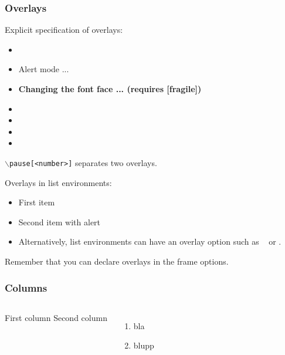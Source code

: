 \begin{frame}[fragile]
  \frametitle{Overlays}
  {\small 

    Explicit specification of overlays:
    \begin{itemize}
    \item {}
    \item \alert<3>{Alert mode ...} 
    \item \textbf<4>{Changing the font face ... (requires [fragile])}
    \item {} 
    \item {}
    \item {}
    \item {}
    \end{itemize}

    \vfill
    {\tt $\backslash$pause[<number>]} separates two overlays.

    \vfill
    Overlays in list environments:
    \begin{itemize}
    \item<9-> First item
    \item<alert@10> Second item with alert
    \item Alternatively, list environments can have an overlay option such as {\tt <+-> } or {\tt <+- alert@ +>}.
    \end{itemize}

    \vfill
    Remember that you can declare overlays in the frame options.
    \hyperlink{frameoptions}{}

  }
\end{frame}
\begin{frame}
  \frametitle{Columns}

  \begin{columns}
    First column
		Second column
    \begin{enumerate}
    \item bla
    \item blupp
    \end{enumerate}
  \end{columns}

\end{frame}

